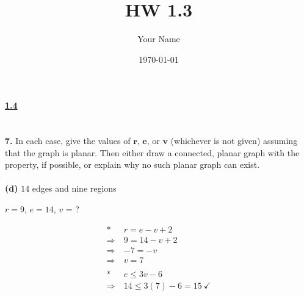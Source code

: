 \documentclass[12pt, letterpaper]{article}
\title{HW 1.3}
\author{Your Name}
\date{\today}
\begin{document}
\paragraph{\underline{1.4} \\ \\} 
\textbf{7.} In each case, give the values of $\textbf{r, e,}$ or $\textbf{v}$ (whichever is not given) assuming that the graph is planar. Then either draw a connected, planar graph with the property, if possible, or explain why no such planar graph can exist. \\ \\
\indent \textbf{(d)} $14$ edges and nine regions
\begin{center}
    $r = 9$, $e = 14$, $v$ = ? 
\end{center}
\begin{align*}
     * \ &r = e - v + 2 \\
    \Rightarrow \ &9 = 14 - v + 2 \\
    \Rightarrow \ &-7 = -v \\
    \Rightarrow \ &\boxed{v = 7} \\ \\
    * \ &e \leq 3v - 6 \\
    \Rightarrow \ &14 \leq 3(7) - 6 = 15 \ \checkmark
\end{align*}
\end{document}
